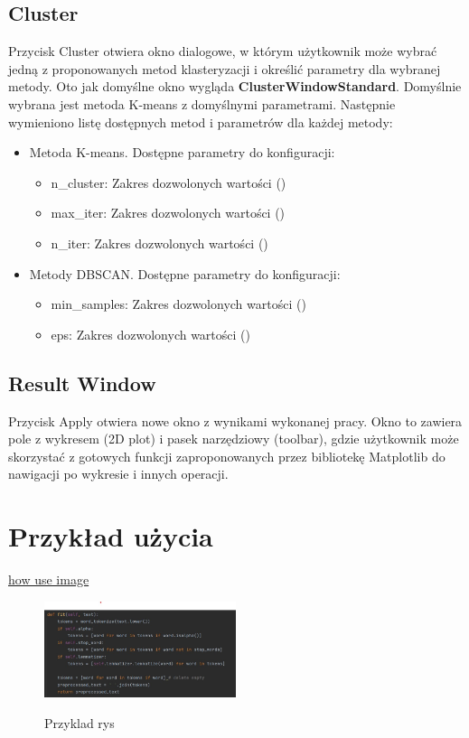 	\subsection{Cluster}
		Przycisk Cluster otwiera okno dialogowe, w którym użytkownik może wybrać jedną z proponowanych metod klasteryzacji i określić parametry dla wybranej metody. Oto jak domyślne okno wygląda \textbf{ClusterWindowStandard}. Domyślnie wybrana jest metoda K-means z domyślnymi parametrami.
		Następnie wymieniono listę dostępnych metod i parametrów dla każdej metody:
		\begin{itemize}
			\item Metoda K-means. Dostępne parametry do konfiguracji:
			\begin{itemize}
				\item n\_cluster: Zakres dozwolonych wartości ()
				\item max\_iter: Zakres dozwolonych wartości ()
				\item n\_iter: Zakres dozwolonych wartości ()
			\end{itemize}
			\item Metody DBSCAN. Dostępne parametry do konfiguracji:
			\begin{itemize}
				\item min\_samples: Zakres dozwolonych wartości ()
				\item eps: Zakres dozwolonych wartości ()
			\end{itemize}
		\end{itemize}
			
		\subsection{Result Window}		
			Przycisk Apply otwiera nowe okno z wynikami wykonanej pracy. Okno to zawiera pole z wykresem (2D plot) i pasek narzędziowy (toolbar), gdzie użytkownik może skorzystać z gotowych funkcji zaproponowanych przez bibliotekę Matplotlib do nawigacji po wykresie i innych operacji. 
			

\section{Przykład użycia}



	\underline{how use image}
	\begin{figure}
		\centering
		\scalebox{0.25} {\includegraphics[width=0.5\textwidth]{./img/rys1.jpg	}}
		\caption{Przyklad rys}
		\label{fig:rys1}
	\end{figure}
		
